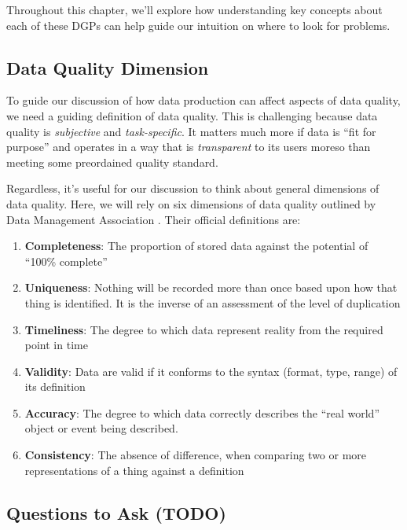 \documentclass[
]{krantz}
\providecommand{\tightlist}{%
  \setlength{\itemsep}{0pt}\setlength{\parskip}{0pt}}
\begin{document}
Throughout this chapter, we'll explore how understanding key concepts about each of these DGPs can help guide our intuition on where to look for problems.

\hypertarget{data-quality-dimension}{%
\subsection{Data Quality Dimension}\label{data-quality-dimension}}

To guide our discussion of how data production can affect aspects of data quality, we need a guiding definition of data quality.
This is challenging because data quality is \emph{subjective} and \emph{task-specific}.
It matters much more if data is ``fit for purpose'' and operates in a way that is \emph{transparent} to its users moreso than meeting some preordained quality standard.

Regardless, it's useful for our discussion to think about general dimensions of data quality. Here, we will rely on six dimensions of data quality outlined by Data Management Association \citep{dama}.
Their official definitions are:

\begin{enumerate}
\def\labelenumi{\arabic{enumi}.}
\tightlist
\item
  \textbf{Completeness}: The proportion of stored data against the potential of ``100\% complete''
\item
  \textbf{Uniqueness}: Nothing will be recorded more than once based upon how that thing is identified. It is the inverse of an assessment of the level of duplication
\item
  \textbf{Timeliness}: The degree to which data represent reality from the required point in time
\item
  \textbf{Validity}: Data are valid if it conforms to the syntax (format, type, range) of its definition
\item
  \textbf{Accuracy}: The degree to which data correctly describes the ``real world'' object or event
  being described.
\item
  \textbf{Consistency}: The absence of difference, when comparing two or more representations of a
  thing against a definition
\end{enumerate}

\hypertarget{questions-to-ask-todo}{%
\subsection{Questions to Ask (TODO)}\label{questions-to-ask-todo}}
\end{document}
